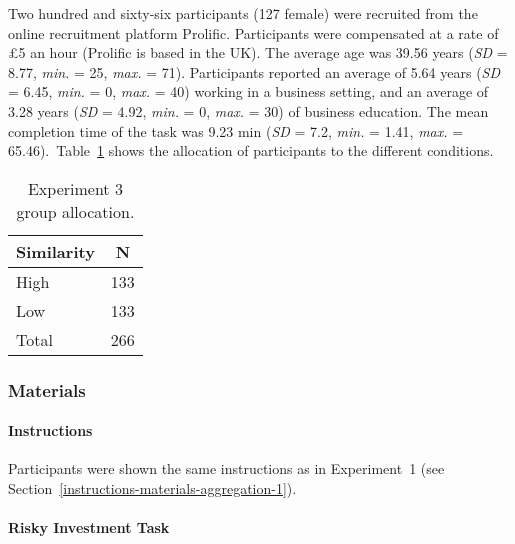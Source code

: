 \documentclass[a4paper, nobind]{templates/ociamthesis}
\theoremstyle{definition}
\theoremstyle{definition}
\theoremstyle{definition}
\theoremstyle{definition}
\theoremstyle{remark}
\begin{document}
Two hundred and sixty-six participants (127 female) were recruited from the online recruitment platform Prolific. Participants were compensated at a rate of \pounds 5 an hour (Prolific is based in the UK). The average age was 39.56 years (\emph{SD} = 8.77, \emph{min.} = 25, \emph{max.} = 71). Participants reported an average of 5.64 years (\emph{SD} = 6.45, \emph{min.} = 0, \emph{max.} = 40) working in a business setting, and an average of 3.28 years (\emph{SD} = 4.92, \emph{min.} = 0, \emph{max.} = 30) of business education. The mean completion time of the task was 9.23 min (\emph{SD} = 7.2, \emph{min.} = 1.41, \emph{max.} = 65.46).~Table~\ref{tab:condition-allocation-aggregation-3}
shows the allocation of participants to the different conditions.

\begin{table}[tbp]

\begin{center}
\begin{threeparttable}

\caption{\label{tab:condition-allocation-aggregation-3}Experiment 3 group allocation.}

\begin{tabular}{ll}
\toprule
Similarity & \multicolumn{1}{c}{N}\\
\midrule
High & 133\\
Low & 133\\
Total & 266\\
\bottomrule
\end{tabular}

\end{threeparttable}
\end{center}

\end{table}

\subsubsection{Materials}

\paragraph{Instructions}

Participants were shown the same instructions as in Experiment~1 (see
Section~\ref{instructions-materials-aggregation-1}).

\hypertarget{task-aggregation-3}{%
\paragraph{Risky Investment Task}\label{task-aggregation-3}}
\end{document}

